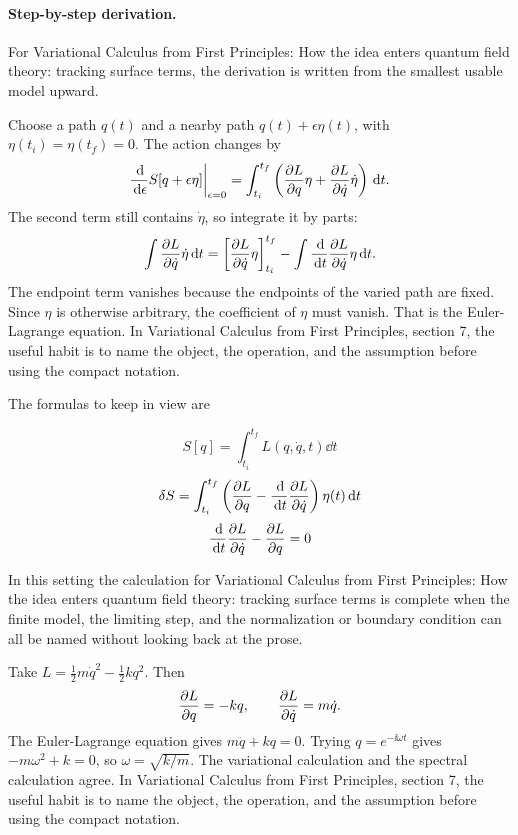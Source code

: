 \paragraph{Step-by-step derivation.}

For Variational Calculus from First Principles: How the idea enters quantum field theory: tracking surface terms, the derivation is written from the smallest usable model upward.

Choose a path \(q(t)\) and a nearby path \(q(t)+\epsilon\eta(t)\), with \(\eta(t_i)=\eta(t_f)=0\).  The action changes by
\[
  \frac{\,\mathrm d}{\,\mathrm d\epsilon}S[q+\epsilon\eta]\bigg|_{\epsilon=0}
  =
  \int_{t_i}^{t_f}
  \left(
  \frac{\partial L}{\partial q}\eta+\frac{\partial L}{\partial\dot q}\dot\eta
  \right)\,\mathrm d t.
\]
The second term still contains \(\dot\eta\), so integrate it by parts:
\[
  \int \frac{\partial L}{\partial\dot q}\dot\eta\,\mathrm d t
  =
  \left[\frac{\partial L}{\partial\dot q}\eta\right]_{t_i}^{t_f}
  -
  \int \frac{\,\mathrm d}{\,\mathrm d t}\frac{\partial L}{\partial\dot q}\eta\,\mathrm d t.
\]
The endpoint term vanishes because the endpoints of the varied path are fixed.  Since \(\eta\) is otherwise arbitrary, the coefficient of \(\eta\) must vanish.  That is the Euler-Lagrange equation.  In Variational Calculus from First Principles, section 7, the useful habit is to name the object, the operation, and the assumption before using the compact notation.

The formulas to keep in view are

\[
  S[q]=\int_{t_i}^{t_f}L(q,\dot q,t)\dd t
\]
\[
  \delta S=\int_{t_i}^{t_f}\left(\frac{\partial L}{\partial q}-\frac{\,\mathrm d}{\,\mathrm d t}\frac{\partial L}{\partial\dot q}\right)\eta(t)\,\mathrm d t
\]
\[
  \frac{\,\mathrm d}{\,\mathrm d t}\frac{\partial L}{\partial\dot q}-\frac{\partial L}{\partial q}=0
\]

In this setting the calculation for Variational Calculus from First Principles: How the idea enters quantum field theory: tracking surface terms is complete when the finite model, the limiting step, and the normalization or boundary condition can all be named without looking back at the prose.




\begin{example}
Take \(L=\frac12m\dot q^2-\frac12kq^2\).  Then
\[
  \frac{\partial L}{\partial q}=-kq,\qquad \frac{\partial L}{\partial\dot q}=m\dot q.
\]
The Euler-Lagrange equation gives \(m\ddot q+kq=0\).  Trying \(q=e^{-\ii\omega t}\) gives \(-m\omega^2+k=0\), so \(\omega=\sqrt{k/m}\).  The variational calculation and the spectral calculation agree.  In Variational Calculus from First Principles, section 7, the useful habit is to name the object, the operation, and the assumption before using the compact notation.
\end{example}



